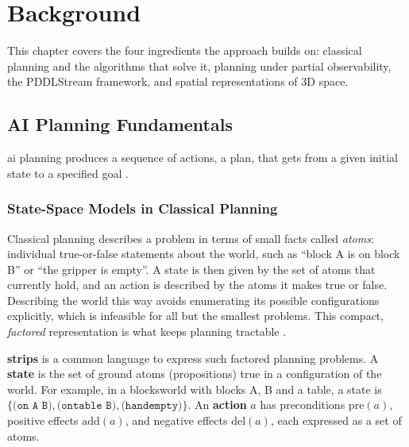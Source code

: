
\chapter{Background}
\label{ch:background}
This chapter covers the four ingredients the approach builds on: classical planning and the algorithms that solve it, planning under partial observability, the PDDLStream framework, and spatial representations of 3D space.

\section{AI Planning Fundamentals}
\Ac{ai} planning produces a sequence of actions, a plan, that gets from a given initial state to a specified goal \cite{ghallab2004automated}.

\subsection{State-Space Models in Classical Planning}
Classical planning describes a problem in terms of small facts called \emph{atoms}: individual true-or-false statements about the world, such as ``block A is on block B'' or ``the gripper is empty''. A state is then given by the set of atoms that currently hold, and an action is described by the atoms it makes true or false. Describing the world this way avoids enumerating its possible configurations explicitly, which is infeasible for all but the smallest problems. This compact, \emph{factored} representation is what keeps planning tractable \cite{geffner2013concise, ghallab2004automated}.

\textbf{\acs{strips}} \cite{fikes1971strips} is a common language to express such factored planning problems. A \textbf{state} is the set of ground atoms (propositions) true in a configuration of the world. For example, in a blocksworld with blocks A, B and a table, a state is $\{\texttt{(on A B)}, \texttt{(ontable B)}, \texttt{(handempty)}\}$. An \textbf{action} $a$ has preconditions $\mathrm{pre}(a)$, positive effects $\mathrm{add}(a)$, and negative effects $\mathrm{del}(a)$, each expressed as a set of atoms.

